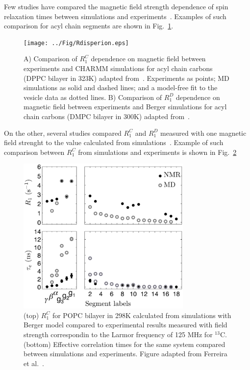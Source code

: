 \documentclass[aps,prl,superscriptaddress,twocolumn]{revtex4}
\begin{document}
Few studies have compared the magnetic field strength dependence of spin relaxation times between simulations and
experiments~\cite{lindahl01,klauda08a,klauda08b,wohlert06}. Examples of such comparison for acyl chain segments are shown in Fig.~\ref{Rdispersion}.
\begin{figure}[]
  \texttt{[image: ../Fig/Rdisperion.eps]}
\newline
  \caption{\label{Rdispersion}
    A) Comparison of $R_1^{C}$ dependence on magnetic field between experiments and CHARMM simulations for acyl chain carbons (DPPC bilayer in 323K) adapted from~\cite{klauda08a}.
    Experiments as points; MD simulations as solid and dashed lines; and a model-free fit to the vesicle data as dotted lines. 
    B) Comparison of $R_1^{D}$ dependence on magnetic field between experiments and Berger simulations for acyl chain carbons (DMPC bilayer in 300K) adapted from~\cite{wohlert06}.
  } 
\end{figure}
On the other, several studies compared $R_1^{C}$ and $R_1^{D}$ measured with one magnetic field strenght to the value calculated from
simulations~\cite{??}. Example of such comparison between $R_1^{C}$ from simulations and experiments is shown in Fig.~\ref{RandEFFCT}
\begin{figure}[]
  \includegraphics[width=8.6cm]{../Fig/RandEFFCT.eps}
\newline
  \caption{\label{RandEFFCT}
    (top)  $R_1^{C}$ for POPC bilayer in 298K calculated from simulations with Berger model compared to experimental results measured 
    with field strength correspondin to the Larmor frequency of 125 MHz for $^{13}$C.
    (bottom) Effective correlation times for the same system compared between simulations and experiments. Figure adapted from Ferreira et al.~\cite{ferreira15}.
  } 
\end{figure}
\end{document}
